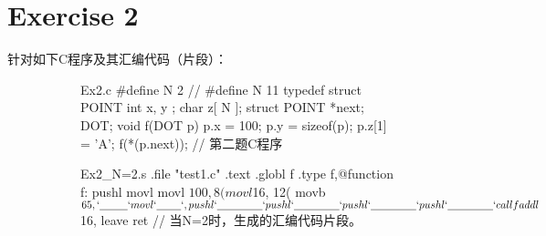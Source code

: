 \documentclass{article}
\begin{document}
\section*{Exercise 2}
针对如下C程序及其汇编代码（片段）：
\begin{figure}
    \begin{multicols}{2}
        \begin{figure}[H]
            \centering
            \begin{verbatimwrite}{Ex2.c}
#define N 2
// \upshape \ttfamily \#define N 11
typedef struct POINT {
    int x, y ;
    char z[ N ];
    struct POINT *next;
} DOT;
void f(DOT p)
{
    p.x = 100;
    p.y = sizeof(p);
    p.z[1] = 'A';
    f(*(p.next));
}
// \songti \upshape 第二题C程序
            \end{verbatimwrite}
            \begin{mdframed}[
                style = Default,
                leftmargin = 74pt,
            ]
                
            \end{mdframed}
        \end{figure}
        \begin{figure}[H]
            \centering
            \begin{verbatimwrite}{Ex2_N=2.s}
    .file "test1.c"
    .text
.globl f
    .type   f,@function
f:
    pushl   %
    movl    %
    movl    $100, 8(%
    movl    $16, 12(%
    movb    $65, `\underline{~~~~~~~~}`
    movl    `\underline{~~~~~~~}`, %
    pushl   `\underline{~~~~~~~~~~~~~}`
    pushl   `\underline{~~~~~~~~~~~~~}`
    pushl   `\underline{~~~~~~~~~~~~~}`
    pushl   `\underline{~~~~~~~~~~~~~}`
    call    f
    addl    $16, %
    leave
    ret
// \songti \upshape 当N=2时，生成的汇编代码片段。
            \end{verbatimwrite}
            \begin{mdframed}[
                style = Default,
                leftmargin = 30pt,
            ]
                
            \end{mdframed}
        \end{figure}
        \begin{figure}[H]
            \centering

\end{figure}
\end{multicols}
\end{figure}
\end{document}
